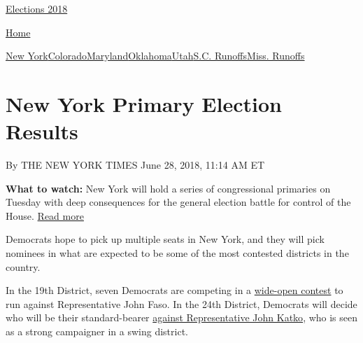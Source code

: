 \href{//www.nytimes3xbfgragh.onion}{}\href{https://www.nytimes3xbfgragh.onion/interactive/2018/us/elections/calendar-primary-results.html}{
Elections 2018}

\href{//www.nytimes3xbfgragh.onion}{ Home}

\href{https://www.nytimes3xbfgragh.onion/interactive/2018/06/26/us/elections/results-new-york-primary-elections.html}{New
York}\href{https://www.nytimes3xbfgragh.onion/interactive/2018/06/26/us/elections/results-colorado-primary-elections.html}{Colorado}\href{https://www.nytimes3xbfgragh.onion/interactive/2018/06/26/us/elections/results-maryland-primary-elections.html}{Maryland}\href{https://www.nytimes3xbfgragh.onion/interactive/2018/06/26/us/elections/results-oklahoma-primary-elections.html}{Oklahoma}\href{https://www.nytimes3xbfgragh.onion/interactive/2018/06/26/us/elections/results-utah-primary-elections-ul.html}{Utah}\href{https://www.nytimes3xbfgragh.onion/interactive/2018/06/26/us/elections/results-south-carolina-primary-runoff-elections.html}{S.C.
Runoffs}\href{https://www.nytimes3xbfgragh.onion/interactive/2018/06/26/us/elections/results-mississippi-primary-runoff-elections.html}{Miss.
Runoffs}

\hypertarget{new-york-primary-election-results}{%
\section{New York Primary Election
Results}\label{new-york-primary-election-results}}

By THE NEW YORK TIMES June 28, 2018, 11:14 AM ET

\textbf{What to watch:} New York will hold a series of congressional
primaries on Tuesday with deep consequences for the general election
battle for control of the House. \protect\hyperlink{}{Read more}

Democrats hope to pick up multiple seats in New York, and they will pick
nominees in what are expected to be some of the most contested districts
in the country.

In the 19th District, seven Democrats are competing in a
\href{https://www.nytimes3xbfgragh.onion/2018/06/12/nyregion/ny-house-democratic-19th-district-faso.html}{wide-open
contest} to run against Representative John Faso. In the 24th District,
Democrats will decide who will be their standard-bearer
\href{https://www.nytimes3xbfgragh.onion/2018/05/30/nyregion/perez-williams-katko-balter-syracuse-house-election.html}{against
Representative John Katko}, who is seen as a strong campaigner in a
swing district.

